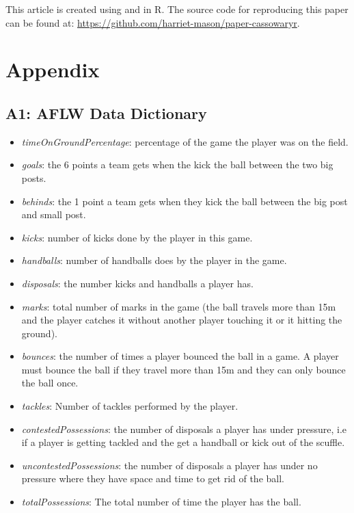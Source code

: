 This article is created using  \citep{knitr} and  \citep{rmarkdown} in R. The source code for reproducing this paper can be found at: \url{https://github.com/harriet-mason/paper-cassowaryr}.

\section{Appendix}\label{appendix}

\subsection{A1: AFLW Data Dictionary}\label{a1-aflw-data-dictionary}

\begin{itemize}
\tightlist
\item
  \emph{timeOnGroundPercentage}: percentage of the game the player was on the field.
\item
  \emph{goals}: the 6 points a team gets when the kick the ball between the two big posts.
\item
  \emph{behinds}: the 1 point a team gets when they kick the ball between the big post and small post.
\item
  \emph{kicks}: number of kicks done by the player in this game.
\item
  \emph{handballs}: number of handballs does by the player in the game.
\item
  \emph{disposals}: the number kicks and handballs a player has.
\item
  \emph{marks}: total number of marks in the game (the ball travels more than 15m and the player catches it without another player touching it or it hitting the ground).
\item
  \emph{bounces}: the number of times a player bounced the ball in a game. A player must bounce the ball if they travel more than 15m and they can only bounce the ball once.
\item
  \emph{tackles}: Number of tackles performed by the player.
\item
  \emph{contestedPossessions}: the number of disposals a player has under pressure, i.e if a player is getting tackled and the get a handball or kick out of the scuffle.
\item
  \emph{uncontestedPossessions}: the number of disposals a player has under no pressure where they have space and time to get rid of the ball.
\item
  \emph{totalPossessions}: The total number of time the player has the ball.

\end{itemize}
